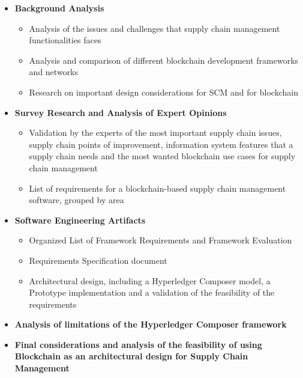 \begin{itemize}
	\item \textbf{Background Analysis} 
	\begin{itemize}
		\item Analysis of the issues and challenges that supply chain management functionalities faces
		\item Analysis and comparison of different blockchain development frameworks and networks
		\item Research on important design considerations for SCM and for blockchain
	\end{itemize}
	\item \textbf{Survey Research and Analysis of Expert Opinions}
	\begin{itemize}
		\item Validation by the experts of the most important supply chain issues, supply chain points of improvement, information system features that a supply chain needs and the most wanted blockchain use cases for supply chain management
		\item List of requirements for a blockchain-based supply chain management software, grouped by area
	\end{itemize}
	\item \textbf{Software Engineering Artifacts}
	\begin{itemize}
		\item Organized List of Framework Requirements and Framework Evaluation
		\item Requirements Specification document
		\item Architectural design, including a Hyperledger Composer model, a Prototype implementation and a validation of the feasibility of the requirements
	\end{itemize}
	\item \textbf{Analysis of limitations of the Hyperledger Composer framework}
	\item \textbf{Final considerations and analysis of the feasibility of using Blockchain as an architectural design for Supply Chain Management}
\end{itemize}



